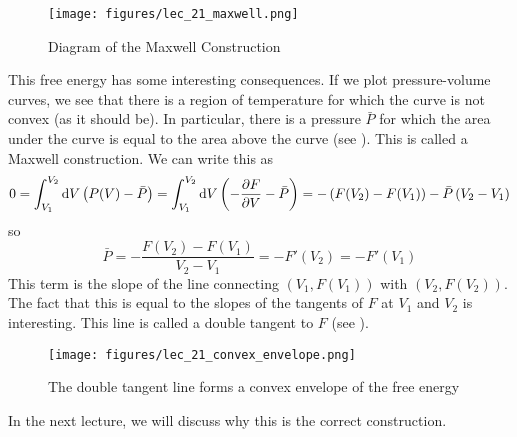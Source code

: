 \documentclass[a4paper,twoside,master.tex]{subfiles}
\begin{document}
\begin{figure}[h]
    \centering
    \texttt{[image: figures/lec\_21\_maxwell.png]}
    \caption{Diagram of the Maxwell Construction}
    \label{fig:lec_21_maxwell}
\end{figure}

This free energy has some interesting consequences. If we plot pressure-volume curves, we see that there is a region of temperature for which the curve is not convex (as it should be). In particular, there is a pressure $ \bar{P} $ for which the area under the curve is equal to the area above the curve (see ). This is called a Maxwell construction. We can write this as
\begin{equation}
    0 = \int_{V_1}^{V_2} \dd{V} \left( P(V) - \bar{P} \right) = \int_{V_1}^{V_2} \dd{V} \left( - \pdv{F}{V} - \bar{P} \right) = - \left( F(V_2) - F(V_1) \right) - \bar{P} \left( V_2 - V_1 \right)
\end{equation}
so
\begin{equation}
    \bar{P} = - \frac{F(V_2) - F(V_1)}{V_2 - V_1} = - F'(V_2) = - F'(V_1)
\end{equation}
This term is the slope of the line connecting $ (V_1, F(V_1)) $ with $ (V_2, F(V_2)) $. The fact that this is equal to the slopes of the tangents of $ F $ at $ V_1 $ and $ V_2 $ is interesting. This line is called a double tangent to $ F $ (see ).

\begin{figure}[h]
    \centering
    \texttt{[image: figures/lec\_21\_convex\_envelope.png]}
    \caption{The double tangent line forms a convex envelope of the free energy}
    \label{fig:lec_21_convex_envelope}
\end{figure}

In the next lecture, we will discuss why this is the correct construction.
\end{document}
